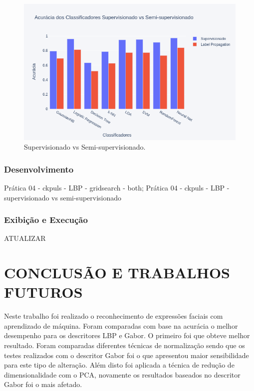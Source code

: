 \documentclass[a4paper, 12 pt, conference]{ieeeconf}  %
\begin{document}
\begin{figure}[!htbp]
	\centering
	\includegraphics[width=1.0\linewidth,clip=true,trim=0cm 0cm 0cm 0cm, keepaspectratio=true]{bar_supervisionado_vs_semi_lbp.png}
	\caption{Supervisionado vs Semi-supervisionado.}
	\label{fig:super_vs_semi_lbp}
\end{figure}

\subsubsection{Desenvolvimento} Prática 04 - ckpuls - LBP - gridsearch - both;
Prática 04 - ckpuls - LBP - supervisionado vs  semi-supervisionado
\subsubsection{Exibição e Execução} ATUALIZAR
\section{CONCLUSÃO E TRABALHOS FUTUROS}

Neste trabalho foi realizado o reconhecimento de expressões faciais com aprendizado de máquina. Foram comparadas com base na acurácia o melhor desempenho para os descritores LBP e Gabor. O primeiro foi que obteve melhor resultado. Foram comparadas diferentes técnicas de normalização sendo que os testes realizados com o descritor Gabor foi o que apresentou maior sensibilidade para este tipo de alteração. Além disto foi aplicada a técnica de redução de dimensionalidade com o PCA, novamente os resultados baseados no descritor Gabor foi o mais afetado.

%

\end{document}
